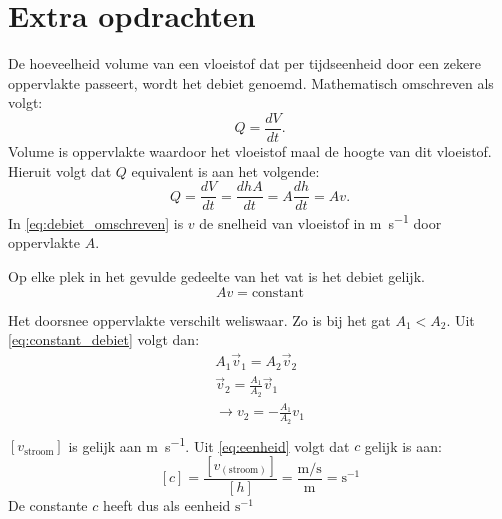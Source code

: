 \documentclass{scrartcl}
\begin{document}
\section{Extra opdrachten}
De hoeveelheid volume van een vloeistof dat per tijdseenheid door een zekere oppervlakte passeert, wordt het debiet genoemd. Mathematisch omschreven als volgt:
\begin{equation}\label{eq:debiet}
    Q = \frac{dV}{dt}.
\end{equation}
Volume is oppervlakte waardoor het vloeistof maal de hoogte van dit vloeistof. Hieruit volgt dat $Q$ equivalent is aan het volgende:
\begin{equation}\label{eq:debiet_omschreven}
    Q = \frac{dV}{dt} = \frac{dhA}{dt} = A\frac{dh}{dt} = Av.
\end{equation}
In \cref{eq:debiet_omschreven} is $v$ de snelheid van vloeistof in \si{\meter\per\second} door oppervlakte $A$.

Op elke plek in het gevulde gedeelte van het vat is het debiet gelijk. 
\begin{equation}\label{eq:constant_debiet}
    Av = \text{constant}
\end{equation}

Het doorsnee oppervlakte verschilt weliswaar. Zo is bij het gat $A_1 < A_2$. Uit \cref{eq:constant_debiet} volgt dan:
\begin{equation}\label{eq:v_h}
\begin{split}
    A_1\vec{v}_1 = A_2\vec{v}_2\\
    \vec{v}_2 = \frac{A_1}{A_2}\vec{v}_1\\
     \rightarrow v_2 = -\frac{A_1}{A_2}v_1\\
    \end{split}
    \end{equation}
$[v_{\text{stroom}}]$ is gelijk aan \si{\meter\per\second}. Uit \cref{eq:eenheid} volgt dat $c$ gelijk is aan:
\begin{equation}\label{eq:eenheid}
[c] = \frac{[v_{(\text{stroom})}]}{[h]} = \frac{\si{\meter\per\second}}{\si{\meter}} = \si{\second}^{-1}
\end{equation}
De constante $c$ heeft dus als eenheid $\si{\second}^{-1}$
\end{document}
